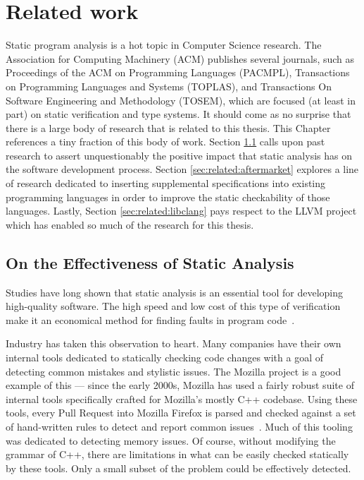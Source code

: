 \chapter{Related work}\label{sec:related}

Static program analysis is a hot topic in Computer Science research.  The Association for Computing Machinery (ACM) publishes several journals, such as Proceedings of the ACM on Programming Languages (PACMPL), Transactions on Programming Languages and Systems (TOPLAS), and Transactions On Software Engineering and Methodology (TOSEM), which are focused (at least in part) on static verification and type systems.  It should come as no surprise that there is a large body of research that is related to this thesis.  This Chapter references a tiny fraction of this body of work.  Section \ref{sec:related:effectiveness} calls upon past research to assert unquestionably the positive impact that static analysis has on the software development process.  Section \ref{sec:related:aftermarket} explores a line of research dedicated to inserting supplemental specifications into existing programming languages in order to improve the static checkability of those languages.  Lastly, Section \ref{sec:related:libclang} pays respect to the LLVM project which has enabled so much of the research for this thesis.

\section{On the Effectiveness of Static Analysis}\label{sec:related:effectiveness}

Studies have long shown that static analysis is an essential tool for developing high-quality software.  The high speed and low cost of this type of verification make it an economical method for finding faults in program code~\cite{staticanal, static-anal-experience}.  

Industry has taken this observation to heart.  Many companies have their own internal tools dedicated to statically checking code changes with a goal of detecting common mistakes and stylistic issues.  The Mozilla project is a good example of this --- since the early 2000s, Mozilla has used a fairly robust suite of internal tools specifically crafted for Mozilla's mostly C++ codebase.  Using these tools, every Pull Request into Mozilla Firefox is parsed and checked against a set of hand-written rules to detect and report common issues~\cite{mozilla-pork-blog, moz-wiki-static-anal}.  Much of this tooling was dedicated to detecting memory issues.  Of course, without modifying the grammar of C++, there are limitations in what can be easily checked statically by these tools.  Only a small subset of the problem could be effectively detected.  

